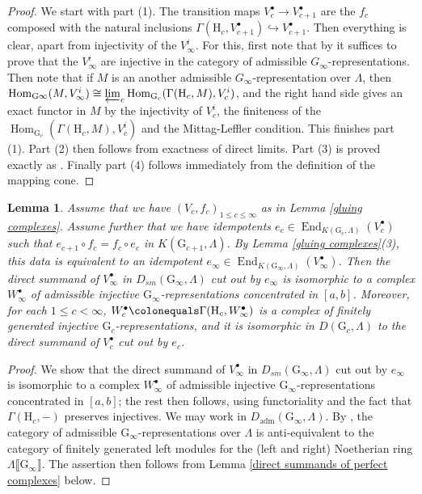 \documentclass{amsart}
\newtheorem{lemma}[subsubsection]{Lemma}
\theoremstyle{remark}
\numberwithin{equation}{subsection}
\DeclareMathOperator{\End}{End}
\DeclareMathOperator{\Hom}{Hom}
\newcommand{\defeq}{\colonequals}
\renewcommand{\(}{\left(}
\renewcommand{\)}{\right)}
\begin{document}
\begin{proof}
We start with part (1). The transition maps $V_c^\bullet \to V_{c+1}^\bullet$ are the $f_c$ composed with the natural inclusions $\Gamma(\mathrm{H}_c,V_{c+1}^\bullet) \hookrightarrow V_{c+1}^\bullet$. Then everything is clear, apart from injectivity of the $V_\infty^i$. For this, first note that by \cite[Proposition 2.1.9]{emerton-ord} it suffices to prove that the $V_\infty^i$ are injective in the category of admissible $G_\infty$-representations. Then note that if $M$ is an another admissible $G_\infty$-representation over $\Lambda$, then $\Hom_{\mathrm{G}\infty}(M, V_\infty^i) \cong \varprojlim_c \Hom_{\mathrm{G}_c}(\Gamma(\mathrm{H}_c,M),V_c^i)$, and the right hand side gives an exact functor in $M$ by the injectivity of $V_c^i$, the finiteness of the $\Hom_{\mathrm{G}_c}(\Gamma(\mathrm{H}_c,M),V_c^i)$ and the Mittag-Leffler condition. This finishes part (1). Part (2) then follows from exactness of direct limits. Part (3) is proved exactly as \cite[Lemma 2.13(3)]{khare-thorne}. Finally part (4) follows immediately from the definition of the mapping cone.
\end{proof}

\begin{lemma}\label{idempotents}
Assume that we have $(V_c,f_c)_{1\leq c \leq \infty}$ as in Lemma \ref{gluing complexes}. Assume further that we have idempotents $e_c \in \End_{K(\mathrm{G}_c,\Lambda)}(V_c^\bullet)$ such that $e_{c+1}\circ f_c = f_c \circ e_c$ in $K(\mathrm{G}_{c+1},\Lambda)$. By Lemma \ref{gluing complexes}(3), this data is equivalent to an idempotent $e_\infty \in \End_{K(\mathrm{G}_\infty,\Lambda)}(V_\infty^\bullet)$. Then the direct summand of $V_\infty^\bullet$ in $D_{sm}(\mathrm{G}_\infty,\Lambda)$ cut out by $e_\infty$ is isomorphic to a complex $W_\infty^\bullet$ of admissible injective $\mathrm{G}_\infty$-representations concentrated in $[a,b]$. Moreover, for each $1\leq c < \infty$, $W_c^\bullet \defeq \Gamma(\mathrm{H}_c,W_\infty^\bullet)$ is a complex of finitely generated injective $\mathrm{G}_c$-representations, and it is isomorphic in $D(\mathrm{G}_c,\Lambda)$ to the direct summand of $V_c^\bullet$ cut out by $e_c$.
\end{lemma}

\begin{proof}
We show that the direct summand of $V_\infty^\bullet$ in $D_{sm}(\mathrm{G}_\infty,\Lambda)$ cut out by $e_\infty$ is isomorphic to a complex $W_\infty^\bullet$ of admissible injective $\mathrm{G}_\infty$-representations concentrated in $[a,b]$; the rest then follows, using functoriality and the fact that $\Gamma(\mathrm{H}_c,-)$ preserves injectives. We may work in $D_{\mathrm
{adm}}(\mathrm{G}_\infty, \Lambda)$. By \cite[Equation (2.2.12)]{emerton-ord1}, the category of admissible $\mathrm{G}_\infty$-representations over $\Lambda$ is anti-equivalent to the category of finitely generated left modules for the (left and right) Noetherian ring $\Lambda \llbracket \mathrm{G}_\infty \rrbracket$. The assertion then follows from Lemma \ref{direct summands of perfect complexes} below.
\end{proof}
\end{document}
